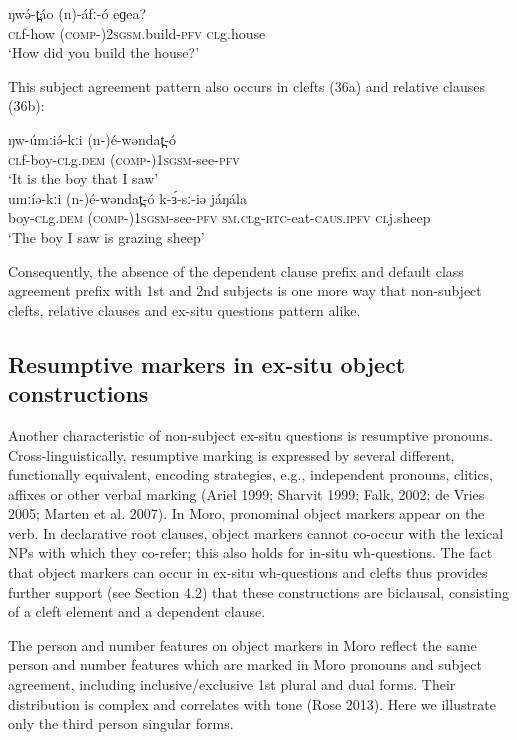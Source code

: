 \ea
\gll	ŋwə́-t̪áo	(n)-áfː-ó	eɡea?\\
	\textsc{cl}f-how	(\textsc{comp-})2\textsc{sgsm}.build-\textsc{pfv}	\textsc{cl}g.house\\
\trans	‘How did you build the house?’
\z

This subject agreement pattern also occurs in clefts (36a) and relative clauses (36b):

\ea
\ea \gll ŋw-úmːiə́-kːi	(n-)é-wəndat̪-ó				\\
	\textsc{cl}f-boy-\textsc{cl}g.\textsc{dem}	(\textsc{comp-})1\textsc{sgsm}-see-\textsc{pfv}\\
\trans		‘It is the boy that I saw’\\
\gll	umːíə-kːi	(n-)é-wəndat̪-ó	k-ɜ́-sː-iə             	jáŋála  \\
		boy-\textsc{cl}g.\textsc{dem}	(\textsc{comp-})1\textsc{sgsm}-see-\textsc{pfv}	\textsc{sm.cl}g-\textsc{rtc}-eat-\textsc{caus}.\textsc{ipfv}	\textsc{cl}j.sheep\\
\trans	‘The boy I saw is grazing sheep’\\
\z
\z

Consequently, the absence of the dependent clause prefix and default class agreement prefix with 1st and 2nd subjects is one more way that non-subject clefts, relative clauses and ex-situ questions pattern alike.

\subsection{Resumptive markers in ex-situ object constructions}
Another characteristic of non-subject ex-situ questions is resumptive pronouns. Cross-linguistically, resumptive marking is expressed by several different, functionally equivalent, encoding strategies, e.g., independent pronouns, clitics, affixes or other verbal marking (Ariel 1999; Sharvit 1999; Falk, 2002; de Vries 2005; Marten et al. 2007). In Moro, pronominal object markers appear on the verb. In declarative root clauses, object markers cannot co-occur with the lexical NPs with which they co-refer; this also holds for in-situ wh-questions. The fact that object markers can occur in ex-situ wh-questions and clefts thus provides further support (see Section 4.2) that these constructions are biclausal, consisting of a cleft element and a dependent clause.

The person and number features on object markers in Moro reflect the same person and number features which are marked in Moro pronouns and subject agreement, including inclusive/exclusive 1st plural and dual forms. Their distribution is complex and correlates with tone (Rose 2013). Here we illustrate only the third person singular forms.

